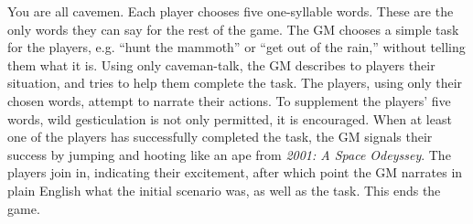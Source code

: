\documentclass[12pt]{article}
\begin{document}
\maketitle
You are all cavemen.
Each player chooses five one-syllable words.
These are the only words they can say for the rest of the game.
The GM chooses a simple task for the players,
e.g. ``hunt the mammoth''
or ``get out of the rain,''
without telling them what it is.
Using only caveman-talk,
the GM describes to players their situation,
and tries to help them complete the task.
The players, using only their chosen words,
attempt to narrate their actions.
To supplement the players' five words,
wild gesticulation is not only permitted,
it is encouraged.
When at least one of the players has successfully completed the task,
the GM signals their success by jumping and hooting
like an ape from \emph{2001: A Space Odeyssey}.
The players join in,
indicating their excitement,
after which point the GM narrates in plain English
what the initial scenario was,
as well as the task.
This ends the game.
\end{document}
